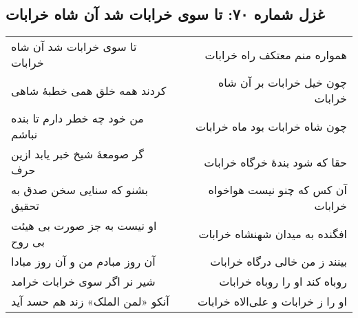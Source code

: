 \begin{center}
\section*{غزل شماره ۷۰: تا سوی خرابات شد آن شاه خرابات}
\label{sec:070}
\begin{longtable}{l p{0.5cm} r}
تا سوی خرابات شد آن شاه خرابات
&&
همواره منم معتکف راه خرابات
\\
کردند همه خلق همی خطبهٔ شاهی
&&
چون خیل خرابات بر آن شاه خرابات
\\
من خود چه خطر دارم تا بنده نباشم
&&
چون شاه خرابات بود ماه خرابات
\\
گر صومعهٔ شیخ خبر یابد ازین حرف
&&
حقا که شود بندهٔ خرگاه خرابات
\\
بشنو که سنایی سخن صدق به تحقیق
&&
آن کس که چنو نیست هواخواه خرابات
\\
او نیست به جز صورت بی هیئت بی روح
&&
افگنده به میدان شهنشاه خرابات
\\
آن روز مبادم من و آن روز مبادا
&&
بینند ز من خالی درگاه خرابات
\\
شیر نر اگر سوی خرابات خرامد
&&
روباه کند او را روباه خرابات
\\
آنکو «لمن الملک» زند هم حسد آید
&&
او را ز خرابات و علی‌الاه خرابات
\\
\end{longtable}
\end{center}
